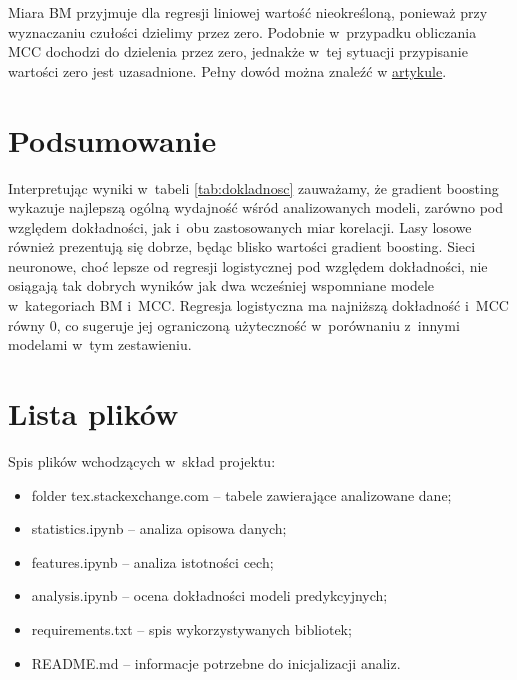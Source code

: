 \documentclass[12pt]{article}
\begin{document}
	Miara BM przyjmuje dla regresji liniowej wartość nieokreśloną, ponieważ przy wyznaczaniu czułości dzielimy przez zero.
	Podobnie w~przypadku obliczania MCC dochodzi do dzielenia przez zero, jednakże w~tej sytuacji przypisanie wartości zero jest uzasadnione.
	Pełny dowód można znaleźć w
	\underline{\href{https://biodatamining.biomedcentral.com/articles/10.1186/s13040-021-00244-z}{artykule}}.

	\section{Podsumowanie}\label{sec:podsumowanie}
	Interpretując wyniki w~tabeli \ref{tab:dokladnosc} zauważamy, że gradient boosting wykazuje najlepszą ogólną wydajność wśród analizowanych modeli, zarówno pod względem dokładności, jak i~obu zastosowanych miar korelacji.
	Lasy losowe również prezentują się dobrze, będąc blisko wartości gradient boosting.
	Sieci neuronowe, choć lepsze od regresji logistycznej pod względem dokładności, nie osiągają tak dobrych wyników jak dwa wcześniej wspomniane modele w~kategoriach BM i~MCC\@.
	Regresja logistyczna ma najniższą dokładność i~MCC równy $0$, co sugeruje jej ograniczoną użyteczność w~porównaniu z~innymi modelami w~tym zestawieniu.

	\section{Lista plików}\label{sec:lista-plikow}
	Spis plików wchodzących w~skład projektu:
	\begin{itemize}
		\item folder tex.stackexchange.com -- tabele zawierające analizowane dane;
		\item statistics.ipynb -- analiza opisowa danych;
		\item features.ipynb -- analiza istotności cech;
		\item analysis.ipynb -- ocena dokładności modeli predykcyjnych;
		\item requirements.txt -- spis wykorzystywanych bibliotek;
		\item README.md -- informacje potrzebne do inicjalizacji analiz.
	\end{itemize}
\end{document}
